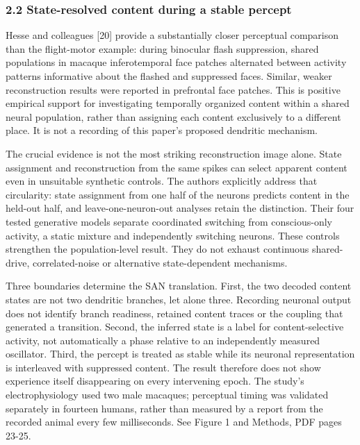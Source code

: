 \documentclass[
  american,
  11pt,
  letterpaper,
]{article}
\begin{document}
\subsubsection{2.2 State-resolved content during a stable percept}\label{state-resolved-content-during-a-stable-percept}

Hesse and colleagues {[}20{]} provide a substantially closer perceptual comparison than the flight-motor example: during binocular flash suppression, shared populations in macaque inferotemporal face patches alternated between activity patterns informative about the flashed and suppressed faces. Similar, weaker reconstruction results were reported in prefrontal face patches. This is positive empirical support for investigating temporally organized content within a shared neural population, rather than assigning each content exclusively to a different place. It is not a recording of this paper's proposed dendritic mechanism.

The crucial evidence is not the most striking reconstruction image alone. State assignment and reconstruction from the same spikes can select apparent content even in unsuitable synthetic controls. The authors explicitly address that circularity: state assignment from one half of the neurons predicts content in the held-out half, and leave-one-neuron-out analyses retain the distinction. Their four tested generative models separate coordinated switching from conscious-only activity, a static mixture and independently switching neurons. These controls strengthen the population-level result. They do not exhaust continuous shared-drive, correlated-noise or alternative state-dependent mechanisms.

Three boundaries determine the SAN translation. First, the two decoded content states are not two dendritic branches, let alone three. Recording neuronal output does not identify branch readiness, retained content traces or the coupling that generated a transition. Second, the inferred state is a label for content-selective activity, not automatically a phase relative to an independently measured oscillator. Third, the percept is treated as stable while its neuronal representation is interleaved with suppressed content. The result therefore does not show experience itself disappearing on every intervening epoch. The study's electrophysiology used two male macaques; perceptual timing was validated separately in fourteen humans, rather than measured by a report from the recorded animal every few milliseconds. See Figure 1 and Methods, PDF pages 23-25.
\end{document}
